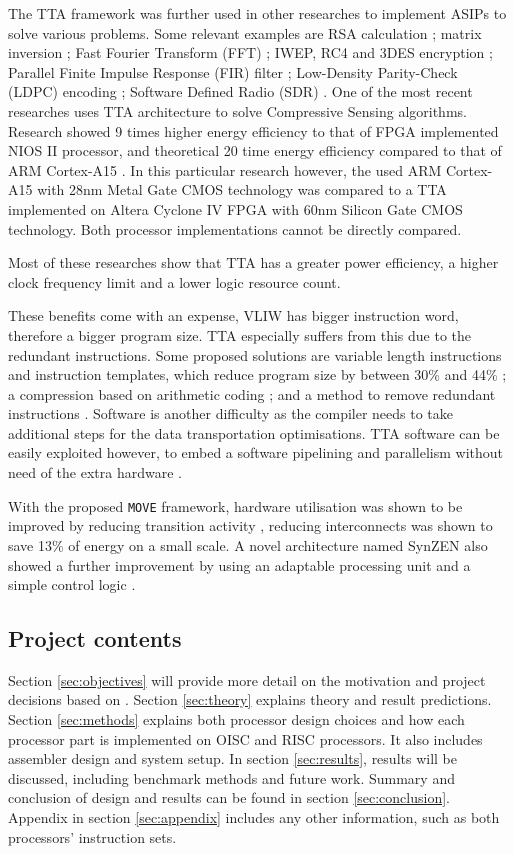 The TTA framework was further used in other researches to implement ASIPs to solve various problems. Some relevant examples are RSA calculation \autocite{6128530}; matrix inversion \autocite{1540373}; Fast Fourier Transform (FFT) \autocite{8682289}; IWEP, RC4 and 3DES encryption \autocite{922340}; Parallel Finite Impulse Response (FIR) filter \autocite{1511285}; Low-Density Parity-Check (LDPC) encoding \autocite{6855236}; Software Defined Radio (SDR) \autocite{7363689}. One of the most recent researches uses TTA architecture to solve Compressive Sensing algorithms. Research showed 9 times higher energy efficiency to that of FPGA implemented NIOS II processor, and theoretical 20 time energy efficiency compared to that of ARM Cortex-A15 \autocite{8573494}. In this particular research however, the used ARM Cortex-A15 with 28nm Metal Gate CMOS technology was compared to a TTA implemented on Altera Cyclone IV FPGA with 60nm Silicon Gate CMOS technology. Both processor implementations cannot be directly compared.

Most of these researches show that TTA has a greater power efficiency, a higher clock frequency limit and a lower logic resource count. 

These benefits come with an expense, VLIW has bigger instruction word, therefore a bigger program size. TTA especially suffers from this due to the redundant instructions. Some proposed solutions are variable length instructions and instruction templates, which reduce program size by between 30\% and 44\% \autocite{1213033,6893206}; a compression based on arithmetic coding \autocite{4627144}; and a method to remove redundant instructions \autocite{5403730}. 
Software is another difficulty as the compiler needs to take additional steps for the data transportation optimisations. TTA software can be easily exploited however, to embed a software pipelining and parallelism without need of the extra hardware \autocite{4595596}.

With the proposed \texttt{MOVE} framework, hardware utilisation was shown to be improved by reducing transition activity \autocite{1207041}, reducing interconnects was shown to save 13\% of energy \autocite{6972455} on a small scale. A novel architecture named SynZEN also showed a further improvement by using an adaptable processing unit and a simple control logic \autocite{6403142}.

\subsection{Project contents}
Section \ref{sec:objectives} will provide more detail on the motivation and project decisions based on . Section \ref{sec:theory} explains theory and result predictions. Section \ref{sec:methods} explains both processor design choices and how each processor part is implemented on OISC and RISC processors. It also includes assembler design and system setup. In section \ref{sec:results}, results will be discussed, including benchmark methods and future work. Summary and conclusion of design and results can be found in section \ref{sec:conclusion}. Appendix in section \ref{sec:appendix} includes any other information, such as both processors' instruction sets.

